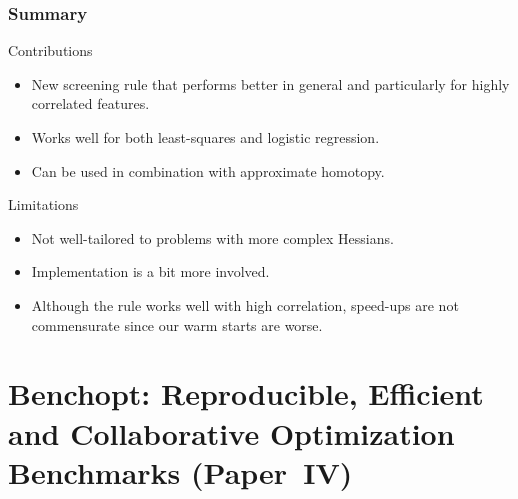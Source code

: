 \documentclass[10pt]{beamer}
\begin{document}
\begin{frame}[c]
  \frametitle{Summary}
  \begin{exampleblock}{Contributions}
    \begin{itemize}
      \item New screening rule that performs better in general and particularly for highly correlated
            features.
      \item Works well for both least-squares and logistic regression.
      \item Can be used in combination with approximate homotopy.
    \end{itemize}
  \end{exampleblock}

  \pause
  \begin{alertblock}{Limitations}
    \begin{itemize}
      \item Not well-tailored to problems with more complex Hessians.
      \item Implementation is a bit more involved.
      \item Although the rule works well with high correlation, speed-ups are not commensurate since
            our warm starts are worse.
    \end{itemize}
  \end{alertblock}
\end{frame}

\section{Benchopt: Reproducible, Efficient and Collaborative Optimization Benchmarks (Paper~IV)}
\end{document}
